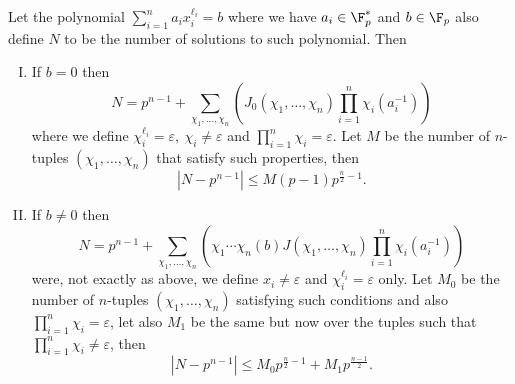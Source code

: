 \begin{theorem}\label{thm: fermat generalization}
   Let the polynomial \(\sum_{i=1}^{n} a_i x_i^{\ell_i} = b \) where we have
   \(a_i \in \F_p^\ast\) and \(b \in \F_p\) also define \(N\) to be the number
   of solutions to such polynomial. Then
   \begin{enumerate}[I.]
      \item If \(b = 0\) then 
         \[
            N = p^{n-1} + \sum_{\chi_1,\dots,\chi_n} \left(
            J_0(\chi_1,\dots,\chi_n) \prod_{i=1}^{n} \chi_i(a_i^{-1}) \right) 
         \] 
         where we define \(\chi_i^{\ell_i} = \varepsilon,\ \chi_i \neq
         \varepsilon\) and \(\prod_{i=1}^{n} \chi_i = \varepsilon\). Let \(M\) 
         be the number of \(n\)-tuples \((\chi_1,\dots,\chi_n)\) that satisfy
         such properties, then 
          \[
             |N - p^{n-1}| \leqslant M(p-1) p^{\frac{n}{2} - 1}.
         \] 
      \item If \(b \neq 0\) then
         \[
            N = p^{n-1} + \sum_{\chi_1, \dots, \chi_n} \left(
            \chi_1\cdots\chi_n(b) J(\chi_1,\dots,\chi_n) \prod_{i =1}^n
            \chi_i(a_i^{-1}) \right) 
         \]
         were, not exactly as above, we define \(x_i \neq  \varepsilon\) and
         \(\chi_i^{\ell_i} = \varepsilon\) only. Let \(M_0\) be the number of
         \(n\)-tuples \((\chi_1,\dots,\chi_n)\) satisfying such conditions and
         also \(\prod_{i=1}^{n}\chi_i = \varepsilon\), let also \(M_1\) be the
         same but now over the tuples such that \(\prod_{i=1}^n \chi_i \neq
         \varepsilon\), then
         \[
            |N-p^{n-1}| \leqslant M_0 p^{\frac{n}{2} -1}  + M_1
            p^{\frac{n-1}{2}}.
         \] 
   \end{enumerate}
\end{theorem}
